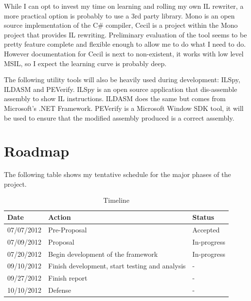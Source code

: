 While I can opt to invest my time on learning and rolling my own IL rewriter, a more practical option is probably to use a 3rd party library. Mono is an open source implementation of the C\# compiler, Cecil is a project within the Mono project that provides IL rewriting. Preliminary evaluation of the tool seems to be pretty feature complete and flexible enough to allow me to do what I need to do. However documentation for Cecil is next to non-existent, it works with low level MSIL, so I expect the learning curve is probably deep.

The following utility tools will also be heavily used during development: ILSpy, ILDASM and PEVerify. ILSpy is an open source application that dis-assemble assembly to show IL instructions. ILDASM does the same but comes from Microsoft’s .NET Framework. PEVerify is a Microsoft Window SDK tool, it will be used to ensure that the modified assembly produced is a correct assembly.

\section{Roadmap}
The following table shows my tentative schedule for the major phases of the project.

\begin{table}[h]
\centering
\begin{tabular}{|l|l|l|}
\hline
Date & Action & Status\\
\hline
07/07/2012 & Pre-Proposal & Accepted\\
07/09/2012 & Proposal & In-progress\\
07/20/2012 & Begin development of the framework & In-progress\\
09/10/2012 & Finish development, start testing and analysis & - \\
09/27/2012 & Finish report & - \\
10/10/2012 & Defense & - \\
\hline
\end{tabular}
\caption{Timeline}
\label{tab:template}
\end{table}



\singlespacing




